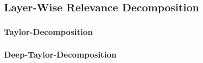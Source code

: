 \subsection{Layer-Wise Relevance Decomposition}
\blindtext[3]

\subsubsection{Taylor-Decomposition}
\blindtext[3]

\subsubsection{Deep-Taylor-Decomposition}
\blindtext[3]